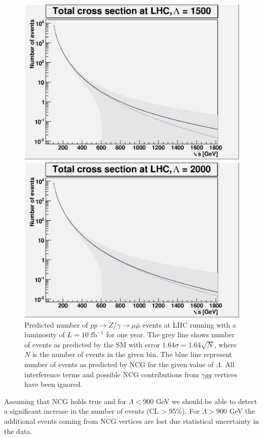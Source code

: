 \begin{figure}[h!tp]
\begin{minipage}[b]{0.475\linewidth}
	  \includegraphics[scale=0.35]{./images/L1500r139.eps}
	\end{minipage}
	\begin{minipage}[b]{0.475\linewidth}
    \centering
	  \includegraphics[scale=0.35]{./images/L2000r139.eps}
	\end{minipage}
		\caption{Predicted number of $pp \rightarrow Z/ \gamma \rightarrow \mu \bar \mu$ events at LHC running with a luminosity of $L=10 \textrm{ fb}^{-1}$ for one year. The grey line shows number of events as predicted by the SM with error $1.64\sigma = 1.64\sqrt{N}$, where $N$ is the number of events in the given bin. The blue line represent number of events as predicted by NCG for the given value of $\Lambda$. All interference terms and possible NCG contributions from $\gamma gg$ vertices have been ignored.}\label{fig:lambdaplot}
\end{figure}

Assuming that NCG holds true and for $\Lambda < 900$ GeV we should be able to detect a significant increase in the number of events (CL > 95\%). For $\Lambda > 900$ GeV the additional events coming from NCG vertices are lost due statistical uncertainty in the data.